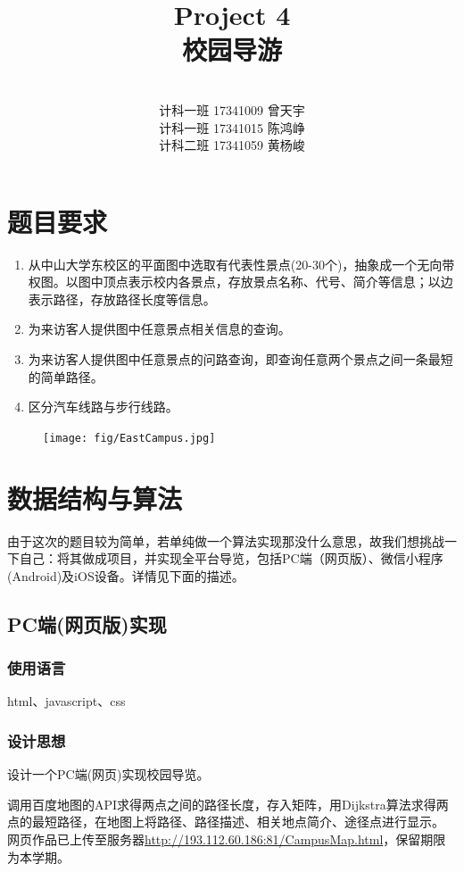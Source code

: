 \documentclass[12pt,UTF8]{ctexart}
\title{{\Huge Project 4\\校园导游}}
\author{\vspace{200pt}\quad\\
计科一班 17341009 曾天宇\\
计科一班 17341015 陈鸿峥\\
计科二班 17341059 黄杨峻}
\date{}
\begin{document}
\begin{spacing}{1.4}

\clearpage\maketitle
\thispagestyle{empty}

\newpage
\setcounter{page}{1}
\section{题目要求}
\begin{enumerate}
	\item 从中山大学东校区的平面图中选取有代表性景点(20-30个)，抽象成一个无向带权图。以图中顶点表示校内各景点，存放景点名称、代号、简介等信息；以边表示路径，存放路径长度等信息。
	\item 为来访客人提供图中任意景点相关信息的查询。
	\item 为来访客人提供图中任意景点的问路查询，即查询任意两个景点之间一条最短的简单路径。
	\item 区分汽车线路与步行线路。
\end{enumerate}
\begin{figure}[H]
\centering
\texttt{[image: fig/EastCampus.jpg]}
\end{figure}

\section{数据结构与算法}
由于这次的题目较为简单，若单纯做一个算法实现那没什么意思，故我们想挑战一下自己：将其做成项目，并实现全平台导览，包括PC端（网页版）、微信小程序(Android)及iOS设备。详情见下面的描述。

\subsection{PC端(网页版)实现}
\subsubsection{使用语言}
html、javascript、css

\subsubsection{设计思想}
设计一个PC端(网页)实现校园导览。
\par 调用百度地图的API求得两点之间的路径长度，存入矩阵，用Dijkstra算法求得两点的最短路径，在地图上将路径、路径描述、相关地点简介、途径点进行显示。
网页作品已上传至服务器\url{http://193.112.60.186:81/CampusMap.html}，保留期限为本学期。


\end{spacing}
\end{document}
